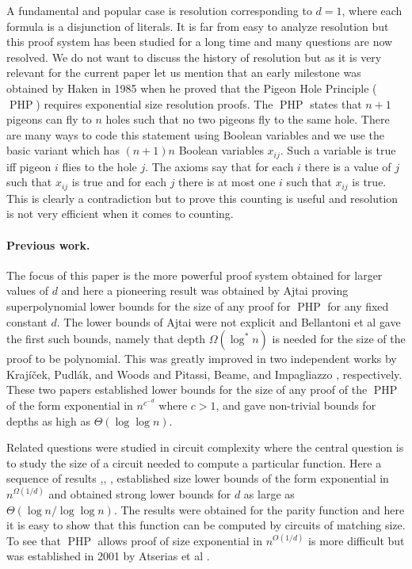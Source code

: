 \documentclass{theoretics}
\DeclareMathOperator{\PHP}{PHP}
\begin{document}
A fundamental and popular case is resolution
corresponding to $d=1$, where each formula is a disjunction of literals. 
It is far from easy to analyze resolution
but this proof system has been studied for a long time
and many questions are now resolved.  We do not want to
discuss the history of resolution but as it is very relevant
for the current paper let us mention that an  early milestone
was obtained by Haken \cite{haken} in 1985 when he proved
that the Pigeon Hole Principle ($\PHP$) requires exponential
size resolution proofs.  The $\PHP$ states that $n+1$ pigeons can 
fly to $n$ holes such that no two pigeons fly to the
same hole.  There are many ways to code this statement
using Boolean variables and we use the basic variant
which has $(n+1)n$ Boolean variables $x_{ij}$.  
Such a variable is true 
iff pigeon $i$ flies to the hole $j$.
The axioms say that for each $i$ there is a value
of $j$ such that $x_{ij}$ is true and for 
each $j$ there is at most one $i$ such that $x_{ij}$
is true.  This is clearly a contradiction but to
prove this counting is useful and resolution is not very 
efficient when it comes to counting.

\paragraph{Previous work.} The focus of this paper is the more
powerful proof system obtained for larger values of 
$d$ and here a pioneering result was obtained by 
Ajtai \cite{Ajtai94Complexity} proving superpolynomial lower bounds 
for the size of any proof for $\PHP$ for any fixed constant $d$.
The lower bounds of Ajtai were not explicit and Bellantoni
et al \cite{BPU92ApproximationAS}
gave the first such bounds, namely that depth $\Omega(\log^* n)$ is
needed for the size of the proof to be polynomial.
This was greatly improved 
in two independent works
by Kraj\'{i}\v{c}ek, Pudl\'{a}k, and Woods \cite{KPW95FregePHPExp}
and Pitassi, Beame, and Impagliazzo \cite{PBI93ExponentialLowerBounds},
respectively.  These two papers established lower bounds
for the size of any proof of the $\PHP$
of the form exponential in $n^{c^{-d}}$ where $c>1$, and gave
non-trivial bounds for depths as high as $\Theta (\log {\log n})$.

Related questions were studied in circuit complexity where the
central question is to study the size of a circuit needed
to compute a particular function.  Here a sequence of
results \cite{fss},\cite{sipser}, \cite{yao}, \cite{jhswitch}
established size lower bounds of
the form exponential in $n^{\Omega (1/d)}$ and obtained
strong lower bounds for $d$
as large as $\Theta (\log n / \log {\log n})$.  
The results were obtained for the parity function and
here it is easy to show that this function can be computed
by circuits of matching size.  To see that $\PHP$ 
allows proof of size exponential in $n^{O(1/d)}$ is
more difficult but was established in 2001 by
Atserias et al \cite{agg01}.
\end{document}
